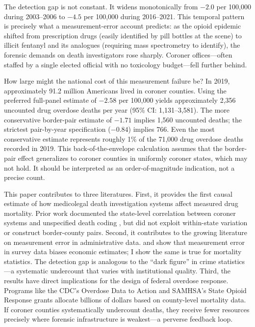 \documentclass[12pt]{article}
\begin{document}
The detection gap is not constant. It widens monotonically from $-2.0$ per 100,000 during 2003--2006 to $-4.5$ per 100,000 during 2016--2021. This temporal pattern is precisely what a measurement-error account predicts: as the opioid epidemic shifted from prescription drugs (easily identified by pill bottles at the scene) to illicit fentanyl and its analogues (requiring mass spectrometry to identify), the forensic demands on death investigators rose sharply. Coroner offices---often staffed by a single elected official with no toxicology budget---fell further behind.

How large might the national cost of this measurement failure be? In 2019, approximately 91.2 million Americans lived in coroner counties. Using the preferred full-panel estimate of $-2.58$ per 100,000 yields approximately 2,356 uncounted drug overdose deaths per year (95\% CI: 1,131--3,581). The more conservative border-pair estimate of $-1.71$ implies 1,560 uncounted deaths; the strictest pair-by-year specification ($-0.84$) implies 766. Even the most conservative estimate represents roughly 1\% of the 71,000 drug overdose deaths recorded in 2019. This back-of-the-envelope calculation assumes that the border-pair effect generalizes to coroner counties in uniformly coroner states, which may not hold. It should be interpreted as an order-of-magnitude indication, not a precise count.

This paper contributes to three literatures. First, it provides the first causal estimate of how medicolegal death investigation systems affect measured drug mortality. Prior work documented the state-level correlation between coroner systems and unspecified death coding \citep{ruhm2017geographic, buchanich2018undercount, warner2013drugs}, but did not exploit within-state variation or construct border-county pairs. Second, it contributes to the growing literature on measurement error in administrative data. \citet{meyer2015household} and \citet{bound2001measurement} show that measurement error in survey data biases economic estimates; I show the same is true for mortality statistics. The detection gap is analogous to the ``dark figure'' in crime statistics \citep{skogan1977dimensions}---a systematic undercount that varies with institutional quality. Third, the results have direct implications for the design of federal overdose response. Programs like the CDC's Overdose Data to Action and SAMHSA's State Opioid Response grants allocate billions of dollars based on county-level mortality data. If coroner counties systematically undercount deaths, they receive fewer resources precisely where forensic infrastructure is weakest---a perverse feedback loop.
\end{document}
